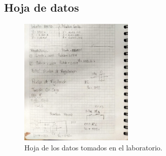 \subsection*{Hoja de datos}
\begin{figure}[ht!]
    \centering
    \includegraphics[width=0.48\textwidth]{fot/prac4_hoja de tales.jpg}
    \caption{Hoja de los datos tomados en el laboratorio.}
    \label{fig:A4}
\end{figure}